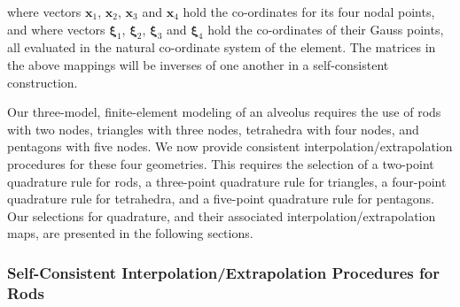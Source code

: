 where vectors $\boldsymbol{x}_1$, $\boldsymbol{x}_2$, $\boldsymbol{x}_3$ and $\boldsymbol{x}_4$ hold the co-ordinates for its four nodal points, and where vectors $\boldsymbol{\xi}_1$, $\boldsymbol{\xi}_2$, $\boldsymbol{\xi}_3$ and $\boldsymbol{\xi}_4$ hold the co-ordinates of their Gauss points, all evaluated in the natural co-ordinate system of the element.  The matrices in the above mappings will be inverses of one another in a self-consistent construction.
\addtocounter{equation}{-1}

Our three-model, finite-element modeling of an alveolus requires the use of rods with two nodes, triangles with three nodes, tetrahedra with four nodes, and pentagons with five nodes.  We now provide consistent interpolation\slash extrapolation procedures for these four geometries.  This requires the selection of a two-point quadrature rule for rods, a three-point quadrature rule for triangles, a four-point quadrature rule for tetrahedra, and a five-point quadrature rule for pentagons.  Our selections for quadrature, and their associated interpolation\slash extrapolation maps, are presented in the following sections.

\subsubsection{Self-Consistent Interpolation\slash Extrapolation Procedures for Rods}

